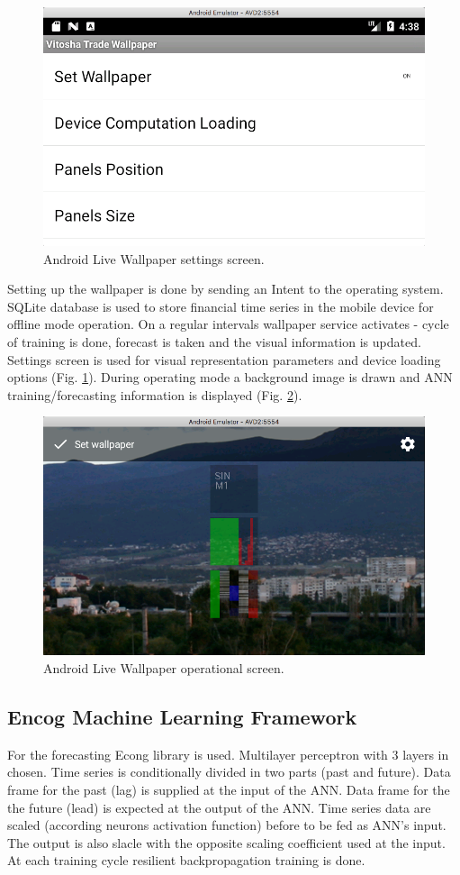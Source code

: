 \documentclass{llncs}
\begin{document}
\begin{figure}[h]
  \centering
  \includegraphics[width=0.5\linewidth]{fig01}
  \caption{Android Live Wallpaper settings screen.}
\label{fig:01}
\end{figure}

Setting up the wallpaper is done by sending an Intent to the operating system. SQLite database is used to store financial time series in the mobile device for offline mode operation. On a regular intervals wallpaper service activates - cycle of training is done, forecast is taken and the visual information is updated. Settings screen is used for visual representation parameters and device loading options (Fig. \ref{fig:01}). During operating mode a background image is drawn and ANN training/forecasting information is displayed (Fig. \ref{fig:02}). 

\begin{figure}[h]
  \centering
  \includegraphics[width=0.5\linewidth]{fig02}
  \caption{Android Live Wallpaper operational screen.}
\label{fig:02}
\end{figure}

\subsection{Encog Machine Learning Framework}

For the forecasting Econg library is used. Multilayer perceptron with 3 layers in chosen. Time series is conditionally divided in two parts (past and future). Data frame for the past (lag) is supplied at the input of the ANN. Data frame for the the future (lead) is expected at the output of the ANN. Time series data are scaled (according neurons activation function) before to be fed as ANN's input. The output is also slacle with the opposite scaling coefficient used at the input. At each training cycle resilient backpropagation training is done. 
\end{document}
